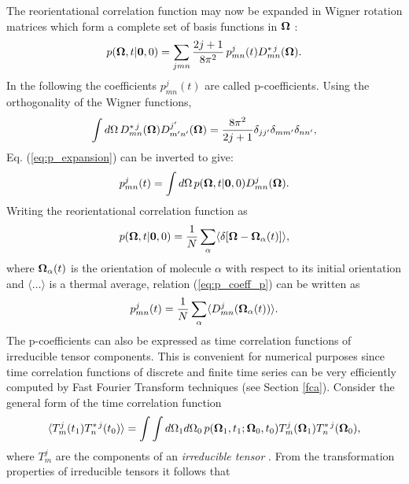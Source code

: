 \documentclass[a4paper,11pt]{report}
\begin{document}
The reorientational correlation function may now be expanded in Wigner rotation matrices \cite{Stone} which form a complete 
set of basis functions in ${\bf\Omega}$ \cite{Edmonds,Satchler}:
\begin{equation}
\label{eq:p_expansion}
p({\bf\Omega},t|{\bf 0},0) = \sum_{j m n}  \frac{2j +
1}{8\pi^2}\,p^j_{m n}(t) D^{*\,j}_{m n}({\bf \Omega}).
\end{equation}
In the following the coefficients $p^j_{m n}(t)$ are called p-coefficients. Using the orthogonality of the Wigner functions,
\begin{equation}
\label{eq:d_ortho}
\int d\Omega\,D^{*\,j}_{m n}({\bf \Omega})D^{j'}_{m' n'}({\bf \Omega})
= \frac{8\pi^2}{2j + 1}\delta_{jj'}\delta_{mm'}\delta_{nn'},
\end{equation}
Eq. (\ref{eq:p_expansion}) can be inverted to give:
\begin{equation}
\label{eq:p_coeff_p}
p^j_{m n}(t) = \int d\Omega\,p({\bf\Omega},t|{\bf 0},0)
D^{j}_{m n}({\bf \Omega}).
\end{equation}
Writing the reorientational correlation function as
\begin{equation}
p({\bf\Omega},t|{\bf 0},0) = \frac{1}{N}
\sum_\alpha \langle\delta[{\bf\Omega} - {\bf\Omega}_\alpha(t)]\rangle,
\end{equation}
where ${\bf\Omega}_\alpha(t)$ is the orientation of molecule $\alpha$ with respect to its initial orientation and 
$\langle\ldots\rangle$ is a thermal average, relation (\ref{eq:p_coeff_p}) can be written as
\begin{equation}
p^j_{m n}(t) =  \frac{1}{N}
\sum_\alpha \langle D^{j}_{m n}({\bf\Omega}_\alpha(t))\rangle.
\end{equation}
The p-coefficients can also be expressed as time correlation functions of irreducible tensor components. This is convenient 
for numerical purposes since time correlation functions of discrete and finite time series can be very efficiently computed 
by Fast Fourier Transform techniques (see Section \ref{fca}). Consider the general form of the time correlation function
\begin{equation}
\label{eq:tt_t_correl}
\langle T^j_m(t_1) T^{*\,j}_n(t_0) \rangle =
\int\int d\Omega_1 d\Omega_0\,p({\bf\Omega}_1,t_1;{\bf\Omega}_0,t_0)
T^j_m({\bf\Omega}_1)T^{*\,j}_n({\bf\Omega}_0),
\end{equation}
where $T^j_m$ are the components of an {\em irreducible tensor} \cite{Edmonds,Satchler}. From the transformation properties of
irreducible tensors it follows that
\end{document}
